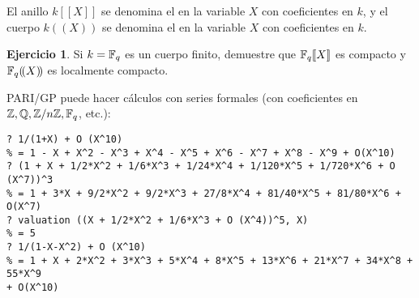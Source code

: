 \documentclass{article}
\numberwithin{equation}{section}
\theoremstyle{definition}
\newtheorem{ejerc}{Ejercicio}
\begin{document}
El anillo $k [\![X]\!]$ se denomina el  en
la variable $X$ con coeficientes en $k$, y el cuerpo $k (\!(X)\!)$ se denomina
el  en la variable $X$ con coeficientes en
$k$.

\begin{ejerc}
  Si $k = \mathbb{F}_q$ es un cuerpo finito, demuestre que $\mathbb{F}_q [\![X]\!]$
  es compacto y $\mathbb{F}_q (\!(X)\!)$ es localmente compacto.
\end{ejerc}

\begin{framed}
  PARI/GP puede hacer cálculos con series formales (con coeficientes
  en $\mathbb{Z}, \mathbb{Q}, \mathbb{Z}/n\mathbb{Z}, \mathbb{F}_q$, etc.):

{\small
\begin{verbatim}
? 1/(1+X) + O (X^10)
% = 1 - X + X^2 - X^3 + X^4 - X^5 + X^6 - X^7 + X^8 - X^9 + O(X^10)
? (1 + X + 1/2*X^2 + 1/6*X^3 + 1/24*X^4 + 1/120*X^5 + 1/720*X^6 + O (X^7))^3
% = 1 + 3*X + 9/2*X^2 + 9/2*X^3 + 27/8*X^4 + 81/40*X^5 + 81/80*X^6 + O(X^7)
? valuation ((X + 1/2*X^2 + 1/6*X^3 + O (X^4))^5, X)
% = 5
? 1/(1-X-X^2) + O (X^10)
% = 1 + X + 2*X^2 + 3*X^3 + 5*X^4 + 8*X^5 + 13*X^6 + 21*X^7 + 34*X^8 + 55*X^9
+ O(X^10)
\end{verbatim}}
\end{framed}



{\small}
\end{document}
